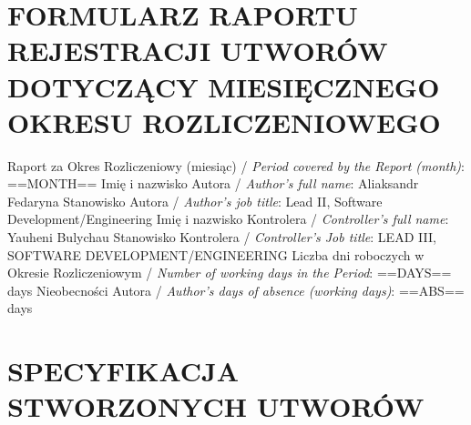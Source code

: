 \documentclass[10pt]{report}
\begin{document}
	\section*{FORMULARZ RAPORTU REJESTRACJI UTWORÓW DOTYCZĄCY MIESIĘCZNEGO OKRESU ROZLICZENIOWEGO}
		
	{\small Raport za Okres Rozliczeniowy (miesiąc) / \textit{Period covered by the Report (month)}: ==MONTH==}\newline
	{\small Imię i nazwisko Autora / \textit{Author's full name}: Aliaksandr Fedaryna}\newline
	{\small Stanowisko Autora / \textit{Author's job title}: Lead II, Software Development/Engineering}\newline
	{\small Imię i nazwisko Kontrolera / \textit{Controller's full name}: Yauheni Bulychau}\newline
	{\small Stanowisko Kontrolera / \textit{Controller's Job title}: LEAD III, SOFTWARE DEVELOPMENT/ENGINEERING}\newline
	{\small Liczba dni roboczych w Okresie Rozliczeniowym / \textit{Number of working days in the Period}: ==DAYS== days}\newline
	{\small Nieobecności Autora / \textit{Author's days of absence (working days)}: ==ABS== days}\newline
	
	\section*{SPECYFIKACJA STWORZONYCH UTWORÓW}
		
\end{document}

